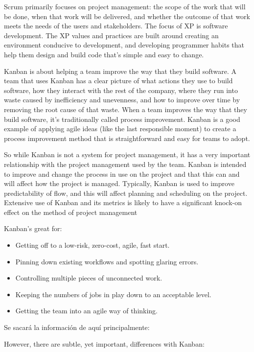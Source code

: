 Scrum primarily focuses on project management: the scope of the work that will
be done, when that work will be delivered, and whether the outcome of that work
meets the needs of the users and stakeholders. The focus of XP is software
development. The XP values and practices are built around creating an
environment conducive to development, and developing programmer habits that help
them design and build code that's simple and easy to change.

Kanban is about helping a team improve the way that they build software. A team
that uses Kanban has a clear picture of what actions they use to build software,
how they interact with the rest of the company, where they run into waste caused
by inefficiency and unevenness, and how to improve over time by removing the
root cause of that waste. When a team improves the way that they build software,
it's traditionally called process improvement. Kanban is a good example of
applying agile ideas (like the last responsible moment) to create a process
improvement method that is straightforward and easy for teams to adopt.

So while Kanban is not a system for project management, it has a very important
relationship with the project management used by the team. Kanban is intended to
improve and change the process in use on the project and that this can and will affect
how the project is managed. Typically, Kanban is used to improve predictability of
flow, and this will affect planning and scheduling on the project. Extensive use of
Kanban and its metrics is likely to have a significant knock-on effect on the method
of project management

Kanban's great for:
\begin{itemize}
    \item Getting off to a low-risk, zero-cost, agile, fast start.
    \item Pinning down existing workflows and spotting glaring errors.
    \item Controlling multiple pieces of unconnected work.
    \item Keeping the numbers of jobs in play down to an acceptable level.
    \item Getting the team into an agile way of thinking.
\end{itemize}

Se sacará la información de aquí principalmente:
\cite{Cole2015-fd} %
\cite{Stellman2014-qr} %

However,
there are subtle, yet important, differences with Kanban:

